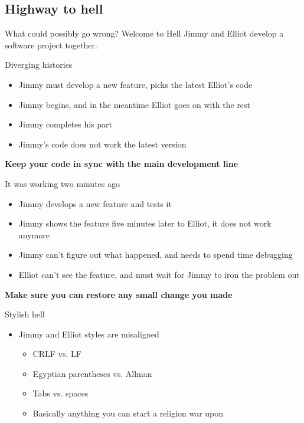 \documentclass[presentation]{beamer}
\begin{document}
\subsection{Highway to hell}

\newcommand{\baddev}[0]{Jimmy}
\newcommand{\gooddev}[0]{Elliot}

\begin{frame}{What could possibly go wrong? Welcome to Hell }
	\baddev{} \cite{jargon} and \gooddev{} develop a software project together.
	\begin{block}{Diverging histories}
		\begin{itemize}
			\item \baddev{} must develop a new feature, picks the latest \gooddev{}'s code
			\item \baddev{} begins, and in the meantime \gooddev{} goes on with the rest
			\item \baddev{} completes his part
			\item \baddev{}'s code does not work the latest version
		\end{itemize}
		\textbf{Keep your code in sync with the main development line}
	\end{block}
	\begin{block}{It was working two minutes ago}
		\begin{itemize}
			\item \baddev{} develops a new feature and tests it
			\item \baddev{} shows the feature five minutes later to \gooddev{}, it does not work anymore
			\item \baddev{} can't figure out what happened, and needs to spend time debugging
			\item \gooddev{} can't see the feature, and must wait for \baddev{} to iron the problem out
		\end{itemize}
		\textbf{Make sure you can restore any small change you made}
	\end{block}
	\begin{block}{Stylish hell}
		\begin{itemize}
			\item \baddev{} and \gooddev{} styles are misaligned
			\begin{itemize}
				\item CRLF vs. LF
				\item Egyptian parentheses \cite{jargon} vs. Allman
				\item Tabs vs. spaces
				\item Basically anything you can start a religion war upon

\end{itemize}
\end{itemize}
\end{block}
\end{frame}
\end{document}
